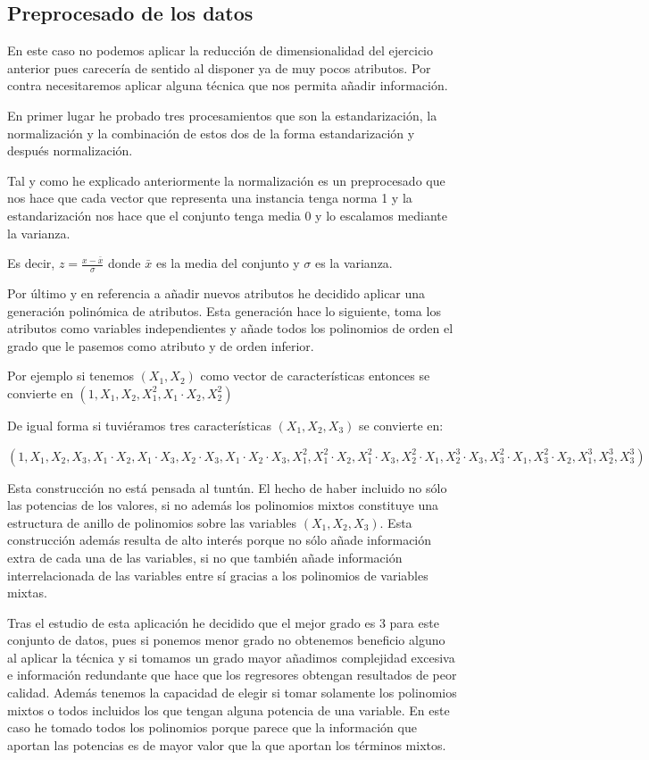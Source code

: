 \documentclass[12pt,a4paper]{article}
\begin{document}
\subsection{Preprocesado de los datos}

En este caso no podemos aplicar la reducción de dimensionalidad del ejercicio anterior pues carecería de sentido al disponer ya de muy pocos atributos. Por contra necesitaremos aplicar alguna técnica que nos permita añadir información.

En primer lugar he probado tres procesamientos que son la estandarización, la normalización y la combinación de estos dos de la forma estandarización y después normalización. 

Tal y como he explicado anteriormente la normalización es un preprocesado que nos hace que cada vector que representa una instancia tenga norma 1 y la estandarización nos hace que el conjunto tenga media 0 y lo escalamos mediante la varianza.

Es decir, $z = \frac{x-\bar{x}}{\sigma}$ donde $\bar{x}$ es la media del conjunto y $\sigma$ es la varianza.

Por último y en referencia a añadir nuevos atributos he decidido aplicar una generación polinómica de atributos. Esta generación hace lo siguiente, toma los atributos como variables independientes y añade todos los polinomios de orden el grado que le pasemos como atributo y de orden inferior.

Por ejemplo si tenemos $(X_1 , X_2)$ como vector de características entonces se convierte en $(1,X_1,X_2,X_1^2,X_1\cdot X_2,X_2^2)$

De igual forma si tuviéramos tres características $(X_1,X_2,X_3)$ se convierte en:

$(1,X_1,X_2,X_3,X_1\cdot X_2,X_1\cdot X_3,X_2\cdot X_3,X_1\cdot X_2\cdot X_3, X_1^2, X_1^2\cdot X_2, X_1^2\cdot X_3, X_2^2\cdot X_1, X_2^3\cdot X_3, X_3^2\cdot X_1, X_3^2\cdot X_2, X_1^3, X_2^3, X_3^3)$

Esta construcción no está pensada al tuntún. El hecho de haber incluido no sólo las potencias de los valores, si no además los polinomios mixtos constituye una estructura de anillo de polinomios sobre las variables $(X_1, X_2, X_3)$. Esta construcción además resulta de alto interés porque no sólo añade información extra de cada una de las variables, si no que también añade información interrelacionada de las variables entre sí gracias a los polinomios de variables mixtas.

Tras el estudio de esta aplicación he decidido que el mejor grado es 3 para este conjunto de datos, pues si ponemos menor grado no obtenemos beneficio alguno al aplicar la técnica y si tomamos un grado mayor añadimos complejidad excesiva e información redundante que hace que los regresores obtengan resultados de peor calidad. Además tenemos la capacidad de elegir si tomar solamente los polinomios mixtos o todos incluidos los que tengan alguna potencia de una variable. En este caso he tomado todos los polinomios porque parece que la información que aportan las potencias es de mayor valor que la que aportan los términos mixtos.
\end{document}

